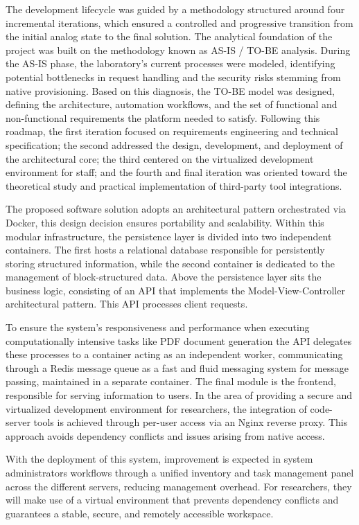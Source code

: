 The development lifecycle was guided by a methodology structured around four incremental iterations, which ensured a controlled and progressive transition from the initial analog state to the final solution. The analytical foundation of the project was built on the methodology known as AS-IS / TO-BE analysis. During the AS-IS phase, the laboratory's current processes were modeled, identifying potential bottlenecks in request handling and the security risks stemming from native provisioning. Based on this diagnosis, the TO-BE model was designed, defining the architecture, automation workflows, and the set of functional and non-functional requirements the platform needed to satisfy. Following this roadmap, the first iteration focused on requirements engineering and technical specification; the second addressed the design, development, and deployment of the architectural core; the third centered on the virtualized development environment for staff; and the fourth and final iteration was oriented toward the theoretical study and practical implementation of third-party tool integrations.

The proposed software solution adopts an architectural pattern orchestrated via Docker, this design decision ensures portability and scalability. Within this modular infrastructure, the persistence layer is divided into two independent containers. The first hosts a relational database responsible for persistently storing structured information, while the second container is dedicated to the management of block-structured data. Above the persistence layer sits the business logic, consisting of an API that implements the Model-View-Controller architectural pattern. This API processes client requests.

To ensure the system's responsiveness and performance when executing computationally intensive tasks like PDF document generation the API delegates these processes to a container acting as an independent worker, communicating through a Redis message queue as a fast and fluid messaging system for message passing, maintained in a separate container. The final module is the frontend, responsible for serving information to users.
In the area of providing a secure and virtualized development environment for researchers, the integration of code-server tools is achieved through per-user access via an Nginx reverse proxy. This approach avoids dependency conflicts and issues arising from native access.

With the deployment of this system, improvement is expected in system administrators workflows through a unified inventory and task management panel across the different servers, reducing management overhead. For researchers, they will make use of a virtual environment that prevents dependency conflicts and guarantees a stable, secure, and remotely accessible workspace.

